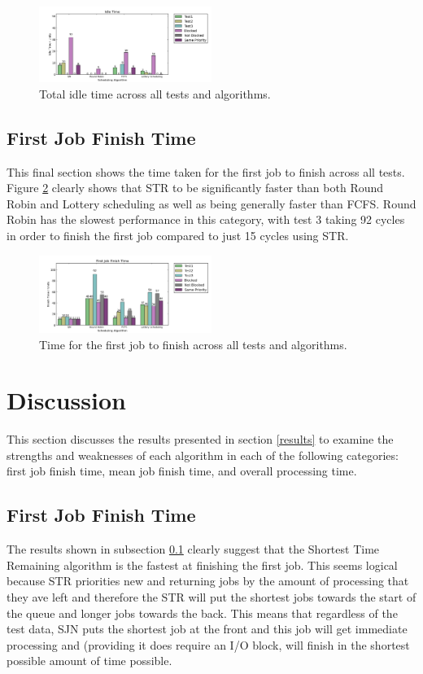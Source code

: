 \documentclass{acm_proc_article-sp}
\begin{document}
\begin{figure}[H]
\centering
\includegraphics[width=0.5\textwidth]{idle_time.png}
\caption{Total idle time across all tests and algorithms.}
\label{fig:idle-time}
\end{figure}

\subsection{First Job Finish Time}
\label{results-fstjob-time}
This final section shows the time taken for the first job to finish across all tests. Figure \ref{fig:fstjob-time} clearly shows that STR to be significantly faster than both Round Robin and Lottery scheduling as well as being generally faster than FCFS. Round Robin has the slowest performance in this category, with test 3 taking 92 cycles in order to finish the first job compared to just 15 cycles using STR.

\begin{figure}[H]
\centering
\includegraphics[width=0.5\textwidth]{fstjob_time.png}
\caption{Time for the first job to finish across all tests and algorithms.}
\label{fig:fstjob-time}
\end{figure}

\section{Discussion}
This section discusses the results presented in section \ref{results} to examine the strengths and weaknesses of each algorithm in each of the following categories: first job finish time, mean job finish time, and overall processing time.

\subsection{First Job Finish Time}
The results shown in subsection \ref{results-fstjob-time} clearly suggest that the Shortest Time Remaining algorithm is the fastest at finishing the first job. This seems logical because STR priorities new and returning jobs by the amount of processing that they ave left and therefore the STR will put the shortest jobs towards the start of the queue and longer jobs towards the back. This means that regardless of the test data, SJN puts the shortest job at the front and this job will get immediate processing and (providing it does require an I/O block, will finish in the shortest possible amount of time possible.
\end{document}

